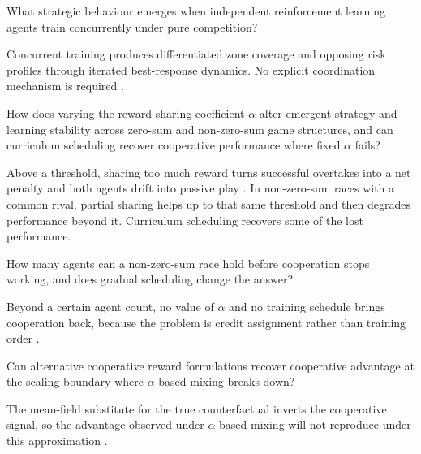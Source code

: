 \begin{description}[leftmargin=3em, labelindent=0em, style=sameline]    
    \item[RQ1.] What strategic behaviour emerges when independent reinforcement learning agents train concurrently under pure competition? \citep{tan1993multiagent, matignon2012independent}
    \item[H1.] Concurrent training produces differentiated zone coverage and opposing risk profiles through iterated best-response dynamics. No explicit coordination mechanism is required \citep{maynardsmith1973hawkdove}.

    \item[RQ2.] How does varying the reward-sharing coefficient $\alpha$ alter emergent strategy and learning stability across zero-sum and non-zero-sum game structures, and can curriculum scheduling recover cooperative performance where fixed $\alpha$ fails? \citep{wang2022irat, matignon2012independent}
    \item[H2.] Above a threshold, sharing too much reward turns successful overtakes into a net penalty and both agents drift into passive play \citep{wei2016lenient, claus1998dynamics}. In non-zero-sum races with a common rival, partial sharing helps up to that same threshold and then degrades performance beyond it. Curriculum scheduling recovers some of the lost performance.

    \item[RQ3.] How many agents can a non-zero-sum race hold before cooperation stops working, and does gradual scheduling change the answer? \citep{agogino2004unifying, zhao2025maca}
    \item[H3.] Beyond a certain agent count, no value of $\alpha$ and no training schedule brings cooperation back, because the problem is credit assignment rather than training order \citep{panait2005cooperative, rashid2018qmix}.

    \item[RQ4.] Can alternative cooperative reward formulations recover cooperative advantage at the scaling boundary where $\alpha$-based mixing breaks down? \citep{wolpert2001optimal, devlin2014potential}
    \item[H4.] The mean-field substitute for the true counterfactual inverts the cooperative signal, so the advantage observed under $\alpha$-based mixing will not reproduce under this approximation \citep{yang2018meanfield, foerster2018coma}.
\end{description}

